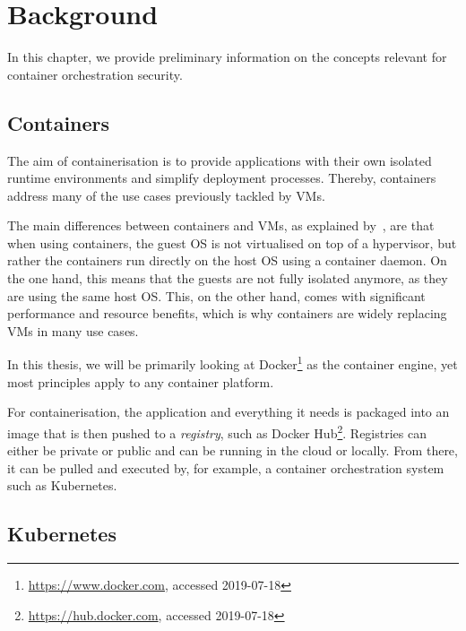 
\chapter{Background} \label{cha:background}

In this chapter, we provide preliminary information on the concepts relevant for container orchestration security.

\section{Containers}

The aim of containerisation is to provide applications with their own isolated runtime environments and simplify deployment processes. Thereby, containers address many of the use cases previously tackled by \acp{VM}. 

The main differences between containers and \acp{VM}, as explained by~\textcite{containersVsVMs}, are that when using containers, the guest OS is not virtualised on top of a hypervisor, but rather the containers run directly on the host OS using a container daemon. On the one hand, this means that the guests are not fully isolated anymore, as they are using the same host OS. This, on the other hand, comes with significant performance and resource benefits, which is why containers are widely replacing \acp{VM} in many use cases.

In this thesis, we will be primarily looking at Docker\footnote{\url{https://www.docker.com}, accessed 2019-07-18} as the container engine, yet most principles apply to any container platform.

For containerisation, the application and everything it needs is packaged into an image that is then pushed to a \textit{registry}, such as Docker Hub\footnote{\url{https://hub.docker.com}, accessed 2019-07-18}. Registries can either be private or public and can be running in the cloud or locally. From there, it can be pulled and executed by, for example, a container orchestration system such as Kubernetes. 

\section{Kubernetes}

